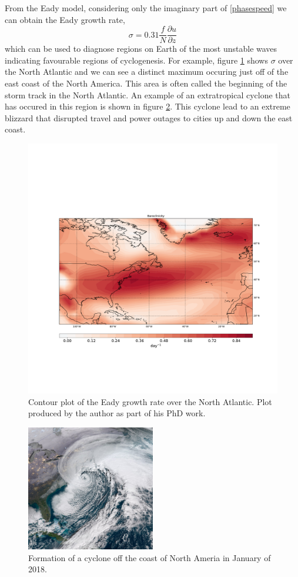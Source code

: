 \documentclass[a4paper,12pt]{article}
\begin{document}
From the Eady model, considering only the imaginary part of \ref{phasespeed} we can obtain the Eady growth rate, 
\begin{equation}
  \sigma = 0.31\frac{f}{N}\frac{\partial u}{\partial z}
\end{equation}
which can be used to diagnose regions on Earth of the most unstable waves indicating favourable regions of cyclogenesis. For example, figure \ref{physicalgrowthrate} shows $\sigma$ over the North Atlantic and we can see a distinct maximum occuring just off of the east coast of the North America. This area is often called the beginning of the storm track in the North Atlantic. An example of an extratropical cyclone that has occured in this region is shown in figure \ref{2018blizzard}. This cyclone lead to an extreme blizzard that disrupted travel and power outages to cities up and down the east coast.
\begin{figure}[!htp]
  \centering
  \includegraphics[width=\textwidth]{baroclinicity_contour_ref.pdf}
  \caption{Contour plot of the Eady growth rate over the North Atlantic. Plot produced by the author as part of his PhD work.}
  \label{physicalgrowthrate}
\end{figure} 
\begin{figure}[!htp]
  \centering
  \includegraphics[width=0.5\textwidth]{noreaster.jpg}
  \caption{Formation of a cyclone off the coast of North Ameria in January of 2018.}
  \label{2018blizzard}
\end{figure} 
\newpage
\end{document}

